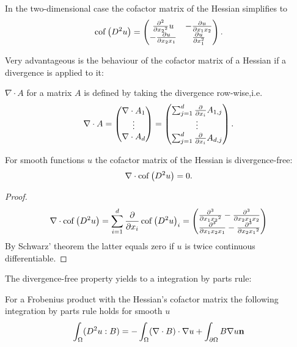In the two-dimensional case the cofactor matrix of the Hessian simplifies to
\begin{align}
\operatorname{cof} \left( D^2 u \right) = \begin{pmatrix}
								\frac {\partial^2} {\partial {x_2}^2} u & -\frac {\partial u}{\partial x_1 x_2} \\
								-\frac {\partial u}{\partial x_2 x_1} & \frac {\partial u}{\partial x_1^2} 
							\end{pmatrix}.
\end{align}


Very advantageous is the behaviour of the cofactor matrix of a Hessian if a divergence is applied to it:
\begin{definition}
	$\nabla \cdot A$ for a matrix $A$ is defined by taking the divergence row-wise,i.e.
\[
	\nabla \cdot A = \begin{pmatrix} \nabla \cdot A_1 \\ \vdots \\ \nabla \cdot A_d\end{pmatrix}
	= \begin{pmatrix} \sum_{j = 1}^{d} \frac \partial {\partial x_i} A_{1,j} \\ \vdots \\ \sum_{j = 1}^{d} \frac \partial {\partial x_i} A_{d,j}\end{pmatrix}.
\]
	
\end{definition}

\begin{lemma} \label{la: divergence free cof}
For smooth functions $u$ the cofactor matrix of the Hessian is divergence-free:
\[
	\nabla \cdot \operatorname{cof} \left( D^2 u \right) = 0.
\] 
\end{lemma}
\begin{proof}
\begin{align*}
	\nabla \cdot \operatorname{cof} \left( D^2 u \right) = \sum_{i=1}^{d} \frac \partial {\partial  x_i}\operatorname{cof} \left( D^2 u \right)_i = 
	\begin{pmatrix}
		\frac {\partial^3} {\partial x_1 {x_2}^2 } -\frac {\partial^3} {\partial{x_2} x_1 {x_2}} \\
				\frac {\partial^3} {\partial {x_1}x_2 {x_1}} -\frac {\partial^3} {\partial x_2 {x_1}^2 }
	\end{pmatrix}
\end{align*}
By Schwarz' theorem the latter equals zero if $u$ is twice continuous differentiable.
\end{proof}

The divergence-free property yields to a integration by parts rule:
\begin{lemma} \label{la: integration by parts Frobenius}
For a Frobenius product with the Hessian's cofactor matrix  the following integration by parts rule holds for smooth $u$
\[
	\int_\Omega (D^2 u : B) = - \int_\Omega (\nabla \cdot B) \cdot \nabla u + \int_{\partial \Omega}  B \nabla u \bf n
\] 
\end{lemma}

